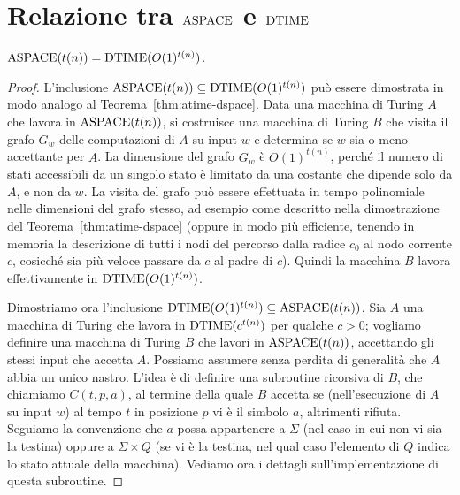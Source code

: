 \section{Relazione tra $\operatorname{ASPACE}$ e $\operatorname{DTIME}$}

\begin{teorema}
  \label{thm:aspace-dtime}
  $\operatorname{ASPACE}(t(n)) = \operatorname{DTIME}(O(1)^{t(n)})$.
\end{teorema}

\begin{proof}
  L'inclusione $\operatorname{ASPACE}(t(n)) \subseteq \operatorname{DTIME}(O(1)^{t(n)})$ può essere dimostrata in modo analogo al
  Teorema~\ref{thm:atime-dspace}. Data una macchina di Turing $A$ che lavora in $\operatorname{ASPACE}(t(n))$,
  si costruisce una macchina di Turing $B$ che visita il grafo $G_w$ delle computazioni di $A$ su input $w$
  e determina se $w$ sia o meno accettante per $A$. La dimensione del grafo $G_w$ è $O(1)^{t(n)}$,
  perché il numero di stati accessibili da un singolo stato è limitato da una costante che dipende
  solo da $A$, e non da $w$.
  La visita del grafo può essere effettuata in tempo polinomiale nelle dimensioni del grafo stesso, ad esempio
  come descritto nella dimostrazione del Teorema~\ref{thm:atime-dspace} (oppure in modo più efficiente,
  tenendo in memoria la descrizione di tutti i nodi del percorso dalla radice $c_0$ al nodo corrente $c$,
  cosicché sia più veloce passare da $c$ al padre di $c$).
  Quindi la macchina $B$ lavora effettivamente in $\operatorname{DTIME}(O(1)^{t(n)})$.
  
  Dimostriamo ora l'inclusione $\operatorname{DTIME}(O(1)^{t(n)}) \subseteq \operatorname{ASPACE}(t(n))$.
  Sia $A$ una macchina di Turing che lavora in $\operatorname{DTIME}(c^{t(n)})$ per qualche $c>0$; vogliamo definire una macchina di Turing $B$ che lavori in $\operatorname{ASPACE}(t(n))$, accettando gli stessi input che accetta $A$.
  Possiamo assumere senza perdita di generalità che $A$ abbia un unico nastro.
  L'idea è di definire una subroutine ricorsiva di $B$, che chiamiamo $C(t,p,a)$, al termine della quale $B$ accetta se (nell'esecuzione di $A$ su input $w$) al tempo $t$ in posizione $p$ vi è il simbolo $a$, altrimenti rifiuta.
  Seguiamo la convenzione che $a$ possa appartenere a $\Sigma$ (nel caso in cui non vi sia la testina) oppure a $\Sigma\times Q$ (se vi è la testina, nel qual caso l'elemento di $Q$ indica lo stato attuale della macchina). Vediamo ora i dettagli sull'implementazione di questa subroutine.
  

\end{proof}
